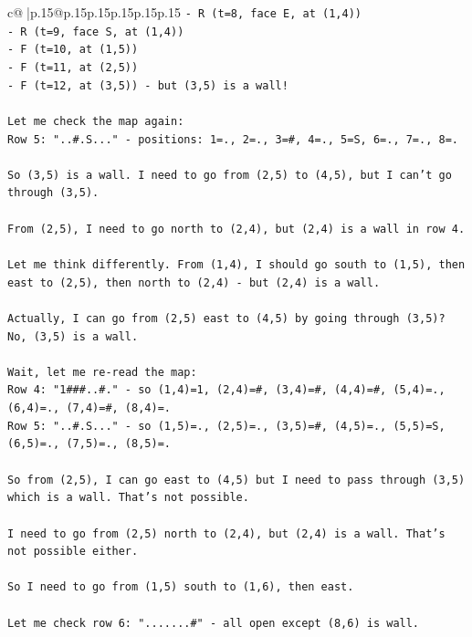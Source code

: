 \documentclass{article}
\begin{document}
{\begin{supertabular}{c@{$\;$}|p{.15\linewidth}@{}p{.15\linewidth}p{.15\linewidth}p{.15\linewidth}p{.15\linewidth}p{.15\linewidth}}
{{{\texttt{{-} R (t=8, face E, at (1,4))} \\
\texttt{{-} R (t=9, face S, at (1,4))} \\
\texttt{{-} F (t=10, at (1,5))} \\
\texttt{{-} F (t=11, at (2,5))} \\
\texttt{{-} F (t=12, at (3,5)) {-} but (3,5) is a wall!} \\
\\ 
\texttt{Let me check the map again:} \\
\texttt{Row 5: "..\#.S..." {-} positions: 1=., 2=., 3=\#, 4=., 5=S, 6=., 7=., 8=.} \\
\\ 
\texttt{So (3,5) is a wall. I need to go from (2,5) to (4,5), but I can't go through (3,5).} \\
\\ 
\texttt{From (2,5), I need to go north to (2,4), but (2,4) is a wall in row 4.} \\
\\ 
\texttt{Let me think differently. From (1,4), I should go south to (1,5), then east to (2,5), then north to (2,4) {-} but (2,4) is a wall.} \\
\\ 
\texttt{Actually, I can go from (2,5) east to (4,5) by going through (3,5)? No, (3,5) is a wall.} \\
\\ 
\texttt{Wait, let me re{-}read the map:} \\
\texttt{Row 4: "1\#\#\#..\#." {-} so (1,4)=1, (2,4)=\#, (3,4)=\#, (4,4)=\#, (5,4)=., (6,4)=., (7,4)=\#, (8,4)=.} \\
\texttt{Row 5: "..\#.S..." {-} so (1,5)=., (2,5)=., (3,5)=\#, (4,5)=., (5,5)=S, (6,5)=., (7,5)=., (8,5)=.} \\
\\ 
\texttt{So from (2,5), I can go east to (4,5) but I need to pass through (3,5) which is a wall. That's not possible.} \\
\\ 
\texttt{I need to go from (2,5) north to (2,4), but (2,4) is a wall. That's not possible either.} \\
\\ 
\texttt{So I need to go from (1,5) south to (1,6), then east.} \\
\\ 
\texttt{Let me check row 6: ".......\#" {-} all open except (8,6) is wall.} \\
\\ 
}}}
\end{supertabular}}
\end{document}
